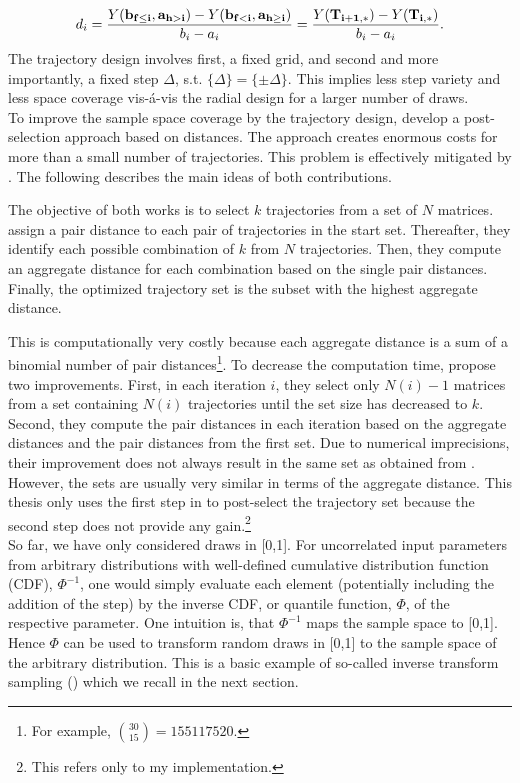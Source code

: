 \begin{align} \label{eq:traj}
d_i =  \frac{Y(\bold{b_{f \leq i}}, \bold{a_{h>i}}) - Y(\bold{b_{f<i}}, \bold{a_{h \geq i}})}{b_i - a_i} = \frac{Y(\bold{T_{i+1,*})} -  Y(\bold{T_{i,*}})}{b_i - a_i}.
\end{align}
The trajectory design involves first, a fixed grid, and second and more importantly, a fixed step $\Delta$, s.t. $\{\Delta\} = \{\pm \Delta\}$. This implies less step variety and less space coverage vis-á-vis the radial design for a larger number of draws.\\

\noindent
To improve the sample space coverage by the trajectory design, \cite{campolongo2007effective} develop a post-selection approach based on distances. The approach creates enormous costs for more than a small number of trajectories. This problem is effectively mitigated by \cite{ge2014efficient}. The following describes the main ideas of both contributions.

The objective of both works is to select $k$ trajectories from a set of $N$ matrices. \cite{campolongo2007effective} assign a pair distance to each pair of trajectories in the start set. Thereafter, they identify each possible combination of $k$ from $N$ trajectories. Then, they compute an aggregate distance for each combination based on the single pair distances. Finally, the optimized trajectory set is the subset with the highest aggregate distance.

This is computationally very costly because each aggregate distance is a sum of a binomial number of pair distances\footnote{For example, $\binom{30}{15} = 155117520$.}. To decrease the computation time, \cite{ge2014efficient} propose two improvements. First, in each iteration $i$, they select only $N(i)-1$ matrices from a set containing $N(i)$ trajectories until the set size has decreased to $k$. Second, they compute the pair distances in each iteration based on the aggregate distances and the pair distances from the first set. Due to numerical imprecisions, their improvement does not always result in the same set as obtained from \cite{campolongo2007effective}. However, the sets are usually very similar in terms of the aggregate distance. This thesis only uses the first step in \cite{ge2014efficient} to post-select the trajectory set because the second step does not provide any gain.\footnote{This refers only to my implementation.}\\


\noindent
So far, we have only considered draws in [0,1]. For uncorrelated input parameters from arbitrary distributions with well-defined cumulative distribution function (CDF), $\Phi^{-1}$, one would simply evaluate each element (potentially including the addition of the step) by the inverse CDF, or quantile function, $\Phi$, of the respective parameter. One intuition is, that $\Phi^{-1}$ maps the sample space to [0,1]. Hence $\Phi$ can be used to transform random draws in [0,1] to the sample space of the arbitrary distribution. This is a basic example of so-called inverse transform sampling (\cite{devroye1986sample}) which we recall in the next section.



